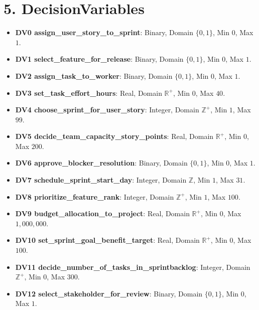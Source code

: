 \documentclass[a4paper,11pt]{article}
\begin{document}
\section{5. DecisionVariables}
\begin{itemize}[leftmargin=2.2em]
  \item \textbf{DV0 assign\_user\_story\_to\_sprint}: Binary, Domain $\{0,1\}$, Min $0$, Max $1$.
  \item \textbf{DV1 select\_feature\_for\_release}: Binary, Domain $\{0,1\}$, Min $0$, Max $1$.
  \item \textbf{DV2 assign\_task\_to\_worker}: Binary, Domain $\{0,1\}$, Min $0$, Max $1$.
  \item \textbf{DV3 set\_task\_effort\_hours}: Real, Domain $\mathbb{R}^{+}$, Min $0$, Max $40$.
  \item \textbf{DV4 choose\_sprint\_for\_user\_story}: Integer, Domain $\mathbb{Z}^{+}$, Min $1$, Max $99$.
  \item \textbf{DV5 decide\_team\_capacity\_story\_points}: Real, Domain $\mathbb{R}^{+}$, Min $0$, Max $200$.
  \item \textbf{DV6 approve\_blocker\_resolution}: Binary, Domain $\{0,1\}$, Min $0$, Max $1$.
  \item \textbf{DV7 schedule\_sprint\_start\_day}: Integer, Domain $\mathbb{Z}$, Min $1$, Max $31$.
  \item \textbf{DV8 prioritize\_feature\_rank}: Integer, Domain $\mathbb{Z}^{+}$, Min $1$, Max $100$.
  \item \textbf{DV9 budget\_allocation\_to\_project}: Real, Domain $\mathbb{R}^{+}$, Min $0$, Max $1{,}000{,}000$.
  \item \textbf{DV10 set\_sprint\_goal\_benefit\_target}: Real, Domain $\mathbb{R}^{+}$, Min $0$, Max $100$.
  \item \textbf{DV11 decide\_number\_of\_tasks\_in\_sprintbacklog}: Integer, Domain $\mathbb{Z}^{+}$, Min $0$, Max $300$.
  \item \textbf{DV12 select\_stakeholder\_for\_review}: Binary, Domain $\{0,1\}$, Min $0$, Max $1$.
\end{itemize}
\end{document}
